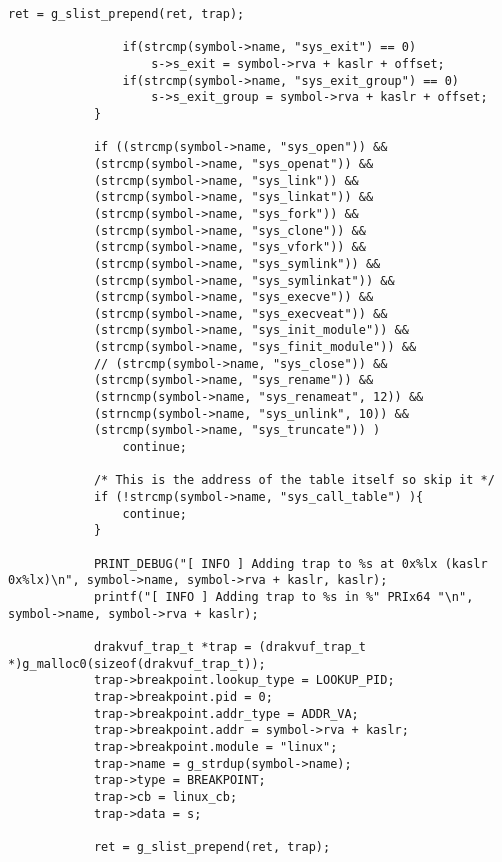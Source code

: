 {\begin{lstlisting}[style=CStyle]
				ret = g_slist_prepend(ret, trap);
				
				if(strcmp(symbol->name, "sys_exit") == 0)
					s->s_exit = symbol->rva + kaslr + offset;
				if(strcmp(symbol->name, "sys_exit_group") == 0)
					s->s_exit_group = symbol->rva + kaslr + offset;
			}
			
			if ((strcmp(symbol->name, "sys_open")) &&
			(strcmp(symbol->name, "sys_openat")) &&
			(strcmp(symbol->name, "sys_link")) &&
			(strcmp(symbol->name, "sys_linkat")) &&
			(strcmp(symbol->name, "sys_fork")) &&
			(strcmp(symbol->name, "sys_clone")) &&
			(strcmp(symbol->name, "sys_vfork")) &&
			(strcmp(symbol->name, "sys_symlink")) &&
			(strcmp(symbol->name, "sys_symlinkat")) &&
			(strcmp(symbol->name, "sys_execve")) &&
			(strcmp(symbol->name, "sys_execveat")) &&
			(strcmp(symbol->name, "sys_init_module")) &&
			(strcmp(symbol->name, "sys_finit_module")) &&
			// (strcmp(symbol->name, "sys_close")) &&
			(strcmp(symbol->name, "sys_rename")) && 
			(strncmp(symbol->name, "sys_renameat", 12)) && 
			(strncmp(symbol->name, "sys_unlink", 10)) &&
			(strcmp(symbol->name, "sys_truncate")) ) 
				continue;
			
			/* This is the address of the table itself so skip it */
			if (!strcmp(symbol->name, "sys_call_table") ){
				continue;
			}
			
			PRINT_DEBUG("[ INFO ] Adding trap to %s at 0x%lx (kaslr 0x%lx)\n", symbol->name, symbol->rva + kaslr, kaslr);
			printf("[ INFO ] Adding trap to %s in %" PRIx64 "\n", symbol->name, symbol->rva + kaslr);
			
			drakvuf_trap_t *trap = (drakvuf_trap_t *)g_malloc0(sizeof(drakvuf_trap_t));
			trap->breakpoint.lookup_type = LOOKUP_PID;
			trap->breakpoint.pid = 0;
			trap->breakpoint.addr_type = ADDR_VA;
			trap->breakpoint.addr = symbol->rva + kaslr;
			trap->breakpoint.module = "linux";
			trap->name = g_strdup(symbol->name);
			trap->type = BREAKPOINT;
			trap->cb = linux_cb;
			trap->data = s;
			
			ret = g_slist_prepend(ret, trap);
			

\end{lstlisting}}
